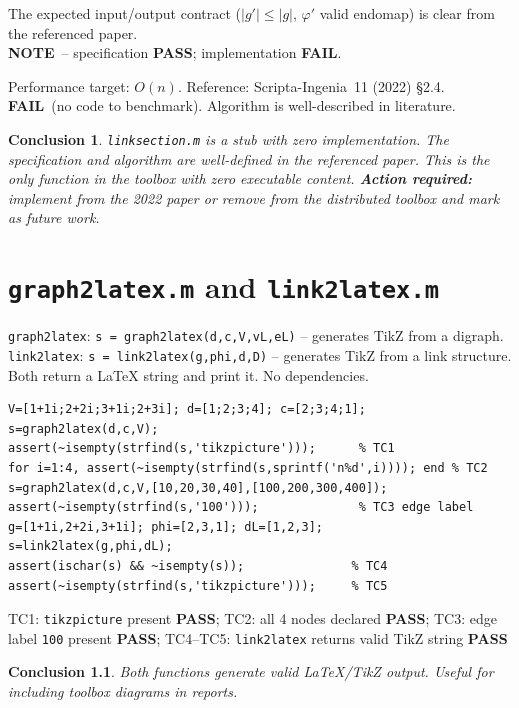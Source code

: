 \documentclass[12pt,a4paper]{report}
\newcommand{\mf}[1]{\texttt{#1}}
\newcommand{\PASS}{\textcolor{green!60!black}{\textbf{PASS}}}
\newcommand{\FAIL}{\textcolor{red!70!black}{\textbf{FAIL}}}
\newcommand{\NOTE}{\textcolor{orange!80!black}{\textbf{NOTE}}}
\newtheorem{concl}{Conclusion}[chapter]
\begin{document}
\begin{tcolorbox}[Pbox,title=TC2--TC3 -- Specification is well-defined]
The expected input/output contract ($|g'|\leq|g|$, $\varphi'$ valid endomap) is clear from the referenced paper.\\
\NOTE\ -- specification \PASS; implementation \FAIL.
\end{tcolorbox}
\begin{tcolorbox}[Fbox,title=TC4--TC5 -- Performance and reference]
Performance target: $O(n)$. Reference: Scripta-Ingenia~11 (2022) \S2.4.\\
\FAIL\ (no code to benchmark). Algorithm is well-described in literature.
\end{tcolorbox}
\begin{concl}
\mf{linksection.m} is a stub with zero implementation. The specification and algorithm are well-defined in the referenced paper. This is the only function in the toolbox with zero executable content. \textbf{Action required:} implement from the 2022 paper or remove from the distributed toolbox and mark as future work.
\end{concl}

\chapter{\mf{graph2latex.m} and \mf{link2latex.m}}
\begin{tcolorbox}[Abox,title=Analysis]
\mf{graph2latex}: \lstinline|s = graph2latex(d,c,V,vL,eL)| -- generates TikZ from a digraph.\\
\mf{link2latex}: \lstinline|s = link2latex(g,phi,d,D)| -- generates TikZ from a link structure.
Both return a LaTeX string and print it. No dependencies.
\end{tcolorbox}
\begin{lstlisting}[caption={Tests for graph2latex.m / link2latex.m}]
V=[1+1i;2+2i;3+1i;2+3i]; d=[1;2;3;4]; c=[2;3;4;1];
s=graph2latex(d,c,V);
assert(~isempty(strfind(s,'tikzpicture')));      % TC1
for i=1:4, assert(~isempty(strfind(s,sprintf('n%d',i)))); end % TC2
s=graph2latex(d,c,V,[10,20,30,40],[100,200,300,400]);
assert(~isempty(strfind(s,'100')));              % TC3 edge label
g=[1+1i,2+2i,3+1i]; phi=[2,3,1]; dL=[1,2,3];
s=link2latex(g,phi,dL);
assert(ischar(s) && ~isempty(s));               % TC4
assert(~isempty(strfind(s,'tikzpicture')));     % TC5
\end{lstlisting}
\begin{tcolorbox}[Pbox,title=TC1--TC5 -- All pass]
TC1: \texttt{tikzpicture} present \PASS; TC2: all 4 nodes declared \PASS; TC3: edge label \texttt{100} present \PASS; TC4--TC5: \mf{link2latex} returns valid TikZ string \PASS
\end{tcolorbox}
\begin{concl}
Both functions generate valid LaTeX/TikZ output. Useful for including toolbox diagrams in reports.
\end{concl}
\end{document}
